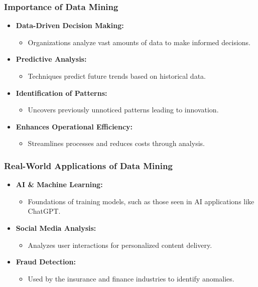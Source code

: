 \documentclass[aspectratio=169]{beamer}
\begin{document}
\begin{frame}[fragile]
    \frametitle{Importance of Data Mining}
    \begin{itemize}
        \item \textbf{Data-Driven Decision Making:}
        \begin{itemize}
            \item Organizations analyze vast amounts of data to make informed decisions.
        \end{itemize}
        \item \textbf{Predictive Analysis:}
        \begin{itemize}
            \item Techniques predict future trends based on historical data.
        \end{itemize}
        \item \textbf{Identification of Patterns:}
        \begin{itemize}
            \item Uncovers previously unnoticed patterns leading to innovation.
        \end{itemize}
        \item \textbf{Enhances Operational Efficiency:}
        \begin{itemize}
            \item Streamlines processes and reduces costs through analysis.
        \end{itemize}
    \end{itemize}
\end{frame}

\begin{frame}[fragile]
    \frametitle{Real-World Applications of Data Mining}
    \begin{itemize}
        \item \textbf{AI \& Machine Learning:}
        \begin{itemize}
            \item Foundations of training models, such as those seen in AI applications like ChatGPT.
        \end{itemize}
        \item \textbf{Social Media Analysis:}
        \begin{itemize}
            \item Analyzes user interactions for personalized content delivery.
        \end{itemize}
        \item \textbf{Fraud Detection:}
        \begin{itemize}
            \item Used by the insurance and finance industries to identify anomalies.
        \end{itemize}
    \end{itemize}
\end{frame}
\end{document}
